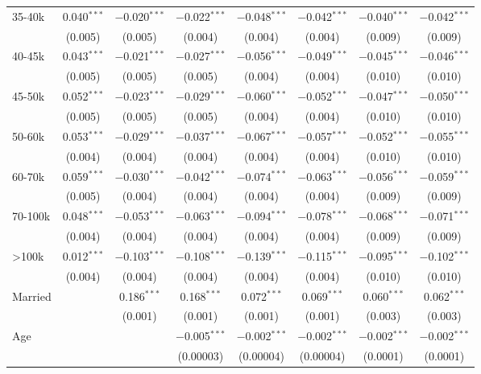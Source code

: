 \begin{table}[!htbp]
\begin{tabular}{@{\extracolsep{5pt}}lccccccc}
  35-40k & 0.040$^{***}$ & $-$0.020$^{***}$ & $-$0.022$^{***}$ & $-$0.048$^{***}$ & $-$0.042$^{***}$ & $-$0.040$^{***}$ & $-$0.042$^{***}$ \\ 
  & (0.005) & (0.005) & (0.004) & (0.004) & (0.004) & (0.009) & (0.009) \\ 
  40-45k & 0.043$^{***}$ & $-$0.021$^{***}$ & $-$0.027$^{***}$ & $-$0.056$^{***}$ & $-$0.049$^{***}$ & $-$0.045$^{***}$ & $-$0.046$^{***}$ \\ 
  & (0.005) & (0.005) & (0.005) & (0.004) & (0.004) & (0.010) & (0.010) \\ 
  45-50k & 0.052$^{***}$ & $-$0.023$^{***}$ & $-$0.029$^{***}$ & $-$0.060$^{***}$ & $-$0.052$^{***}$ & $-$0.047$^{***}$ & $-$0.050$^{***}$ \\ 
  & (0.005) & (0.005) & (0.005) & (0.004) & (0.004) & (0.010) & (0.010) \\ 
  50-60k & 0.053$^{***}$ & $-$0.029$^{***}$ & $-$0.037$^{***}$ & $-$0.067$^{***}$ & $-$0.057$^{***}$ & $-$0.052$^{***}$ & $-$0.055$^{***}$ \\ 
  & (0.004) & (0.004) & (0.004) & (0.004) & (0.004) & (0.010) & (0.010) \\ 
  60-70k & 0.059$^{***}$ & $-$0.030$^{***}$ & $-$0.042$^{***}$ & $-$0.074$^{***}$ & $-$0.063$^{***}$ & $-$0.056$^{***}$ & $-$0.059$^{***}$ \\ 
  & (0.005) & (0.004) & (0.004) & (0.004) & (0.004) & (0.009) & (0.009) \\ 
  70-100k & 0.048$^{***}$ & $-$0.053$^{***}$ & $-$0.063$^{***}$ & $-$0.094$^{***}$ & $-$0.078$^{***}$ & $-$0.068$^{***}$ & $-$0.071$^{***}$ \\ 
  & (0.004) & (0.004) & (0.004) & (0.004) & (0.004) & (0.009) & (0.009) \\ 
  >100k & 0.012$^{***}$ & $-$0.103$^{***}$ & $-$0.108$^{***}$ & $-$0.139$^{***}$ & $-$0.115$^{***}$ & $-$0.095$^{***}$ & $-$0.102$^{***}$ \\ 
  & (0.004) & (0.004) & (0.004) & (0.004) & (0.004) & (0.010) & (0.010) \\ 
  Married &  & 0.186$^{***}$ & 0.168$^{***}$ & 0.072$^{***}$ & 0.069$^{***}$ & 0.060$^{***}$ & 0.062$^{***}$ \\ 
  &  & (0.001) & (0.001) & (0.001) & (0.001) & (0.003) & (0.003) \\ 
  Age &  &  & $-$0.005$^{***}$ & $-$0.002$^{***}$ & $-$0.002$^{***}$ & $-$0.002$^{***}$ & $-$0.002$^{***}$ \\ 
  &  &  & (0.00003) & (0.00004) & (0.00004) & (0.0001) & (0.0001) \\ 

\end{tabular}
\end{table}
